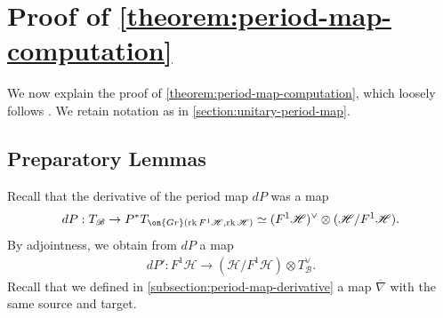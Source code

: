\documentclass[12 pt]{amsart}
\theoremstyle{plain}
\theoremstyle{definition}
\theoremstyle{remark}
\numberwithin{equation}{section}
\DeclareMathOperator\rk{rk}
\DeclareMathOperator\Hom{Hom}
\begin{document}
\appendix
\section{Proof of \autoref{theorem:period-map-computation}}\label{appendix}
We now explain the proof of \autoref{theorem:period-map-computation}, which loosely follows \cite[\S9 and \S10]{Voisin:hodgeTheory}. We retain notation as in \autoref{section:unitary-period-map}.
\subsection{Preparatory Lemmas}
Recall that the derivative of the period map $dP$ was a map 	$$dP : T_{\mathscr B} \to P^* T_{\on{Gr}(\rk F^1 \mathscr H, \rk \mathscr H)} \simeq (F^1
	\mathscr H)^\vee \otimes (\mathscr H/F^1 \mathscr H).$$
By adjointness, we obtain from $dP$ a map
\begin{align*}
	dP' : F^1 \mathscr H \to 
	(\mathscr H/F^1 \mathscr H) \otimes T_{\mathscr B}^\vee.
\end{align*}
Recall that we defined in \autoref{subsection:period-map-derivative} a map $\overline{\nabla}$ with the same source and target.
\end{document}
